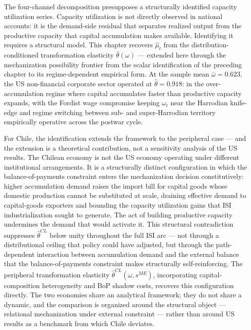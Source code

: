 \documentclass[11pt,a4paper]{article}
\begin{document}
The four-channel decomposition presupposes a structurally identified
capacity utilization series. Capacity utilization is not directly
observed in national accounts: it is the demand-side residual that
separates realized output from the productive capacity that capital
accumulation makes available. Identifying it requires a structural
model. This chapter recovers $\hat{\mu}_t$ from the
distribution-conditioned transformation elasticity
$\hat{\theta}(\omega)$ --- extended here through the mechanization
possibility frontier from the scalar identification of the preceding
chapter to its regime-dependent empirical form. At the sample mean
$\bar{\omega} = 0.623$, the US non-financial corporate sector
operated at $\hat{\theta} = 0.918$: in the over-accumulation regime
where capital accumulates faster than productive capacity expands,
with the Fordist wage compromise keeping $\omega_t$ near the
Harrodian knife-edge and regime switching between sub- and
super-Harrodian territory empirically operative across the postwar
cycle.

For Chile, the identification extends the framework to the peripheral
case --- and the extension is a theoretical contribution, not a
sensitivity analysis of the US results. The Chilean economy is not
the US economy operating under different institutional arrangements.
It is a structurally distinct configuration in which the
balance-of-payments constraint enters the mechanization decision
constitutively: higher accumulation demand raises the import bill
for capital goods whose domestic production cannot be substituted
at scale, draining effective demand to capital-goods exporters and
bounding the capacity utilization gains that ISI industrialization
sought to generate. The act of building productive capacity
undermines the demand that would activate it. This structural
contradiction suppresses $\hat{\theta}^{CL}$ below unity throughout
the full ISI arc --- not through a distributional ceiling that policy
could have adjusted, but through the path-dependent interaction
between accumulation demand and the external balance that the
balance-of-payments constraint makes structurally self-reinforcing.
The peripheral transformation elasticity
$\hat{\theta}^{CL}(\omega, s^{ME})$, incorporating
capital-composition heterogeneity and BoP shadow costs, recovers
this configuration directly. The two economies share an analytical
framework; they do not share a dynamic, and the comparison is
organized around the structural object --- relational mechanization
under external constraint --- rather than around US results as a
benchmark from which Chile deviates.
\end{document}
